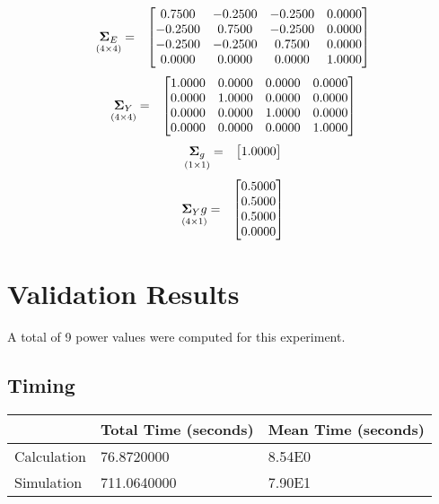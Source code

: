 \documentclass{glimmpse-report}
\begin{document}
\begin{eqnarray*}
\underset{\left(4\times4\right)}{\mathbf{\Sigma}_E} & = & \begin{bmatrix}0.7500 & -0.2500 & -0.2500 & 0.0000\protect\\
-0.2500 & 0.7500 & -0.2500 & 0.0000\protect\\
-0.2500 & -0.2500 & 0.7500 & 0.0000\protect\\
0.0000 & 0.0000 & 0.0000 & 1.0000\protect\\
\end{bmatrix}
\end{eqnarray*}
\begin{eqnarray*}
\underset{\left(4\times4\right)}{\mathbf{\Sigma}_Y} & = & \begin{bmatrix}1.0000 & 0.0000 & 0.0000 & 0.0000\protect\\
0.0000 & 1.0000 & 0.0000 & 0.0000\protect\\
0.0000 & 0.0000 & 1.0000 & 0.0000\protect\\
0.0000 & 0.0000 & 0.0000 & 1.0000\protect\\
\end{bmatrix}
\end{eqnarray*}
\begin{eqnarray*}
\underset{\left(1\times1\right)}{\mathbf{\Sigma}_g} & = & \begin{bmatrix}1.0000\protect\\
\end{bmatrix}
\end{eqnarray*}
\begin{eqnarray*}
\underset{\left(4\times1\right)}{\mathbf{\Sigma}_Yg} & = & \begin{bmatrix}0.5000\protect\\
0.5000\protect\\
0.5000\protect\\
0.0000\protect\\
\end{bmatrix}
\end{eqnarray*}
\section{Validation Results}
A total of 9 power values were computed for this experiment.

\subsection{Timing}
\begin{tabular}{|l|l|l|}
\hline
 & Total Time (seconds) & Mean Time (seconds) \\ 
\hline
Calculation & 76.8720000 & 8.54E0\tabularnewline
\hline
Simulation & 711.0640000 & 7.90E1\tabularnewline
\hline
\end{tabular}
\end{document}

